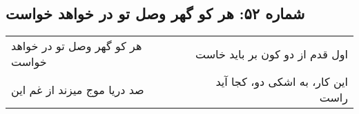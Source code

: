 \begin{center}
\section*{شماره ۵۲: هر کو گهر وصل تو در خواهد خواست}
\label{sec:052}
\begin{longtable}{l p{0.5cm} r}
هر کو گهر وصل تو در خواهد خواست
&&
اول قدم از دو کون بر باید خاست
\\
صد دریا موج میزند از غم این
&&
این کار، به اشکی دو، کجا آید راست
\\
\end{longtable}
\end{center}
